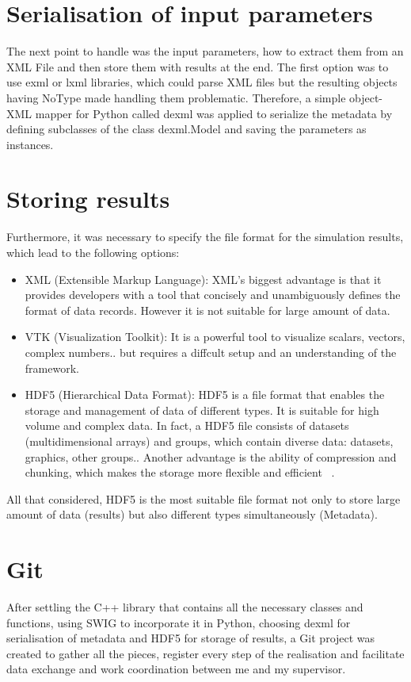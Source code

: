 \section{Serialisation of input parameters}
The next point to handle was the input parameters, how to extract them from an XML File and then store them with results at the end. The first option was to use exml or lxml libraries, which could parse XML files but the resulting objects having NoType made handling them problematic. Therefore, a simple object-XML mapper for Python called dexml was applied to serialize the metadata by defining subclasses of the class dexml.Model and saving the parameters as instances.\\
\section{Storing results}
Furthermore, it was necessary to specify the file format for the simulation results, which lead to the following options:\\
\begin{itemize}
\item XML (Extensible Markup Language): XML's biggest advantage is that it provides developers with a tool that concisely and unambiguously defines the format of data records. However it is not suitable for large amount of data.\\
\item VTK (Visualization Toolkit): It is a powerful tool to visualize scalars, vectors, complex numbers.. but  requires a diffcult setup and an understanding of the framework.\\ 
\item HDF5 (Hierarchical Data Format): HDF5 is a file format that enables the storage and management of data of different types. It is suitable for high volume and complex data. In fact, a HDF5 file consists of datasets (multidimensional arrays) and groups, which contain diverse data: datasets, graphics, other groups.. Another advantage is the ability of compression and chunking, which makes the storage more flexible and efficient ~\cite{hdf5}.\\ 
\end{itemize}
All that considered, HDF5 is the most suitable file format not only to store large amount of data (results) but also different types simultaneously (Metadata).
\section{Git}
After settling the C++ library that contains all the necessary classes and functions, using SWIG to incorporate it in Python, choosing dexml for serialisation of metadata and HDF5 for storage of results, a Git project was created to gather all the pieces, register every step of the realisation and facilitate data exchange and work coordination between me and my supervisor. \\
